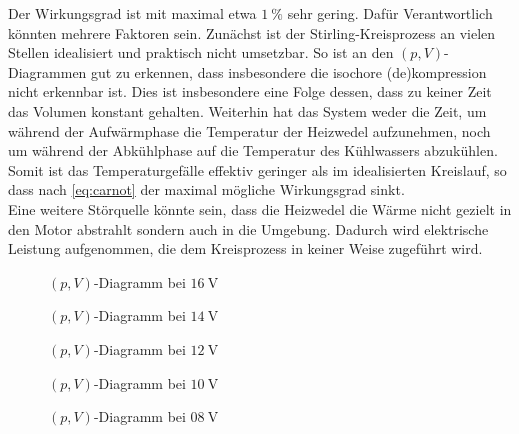 Der Wirkungsgrad ist mit maximal etwa $ \SI{1}{\percent} $ sehr gering. Dafür Verantwortlich könnten mehrere Faktoren sein. Zunächst ist der Stirling-Kreisprozess an vielen Stellen idealisiert und praktisch nicht umsetzbar. So ist an den $ (p,V) $-Diagrammen gut zu erkennen, dass insbesondere die isochore (de)kompression nicht erkennbar ist. Dies ist insbesondere eine Folge dessen, dass zu keiner Zeit das Volumen konstant gehalten. Weiterhin hat das System weder die Zeit, um während der Aufwärmphase die Temperatur der Heizwedel aufzunehmen, noch um während der Abkühlphase auf die Temperatur des Kühlwassers abzukühlen. Somit ist das Temperaturgefälle effektiv geringer als im idealisierten Kreislauf, so dass nach \ref{eq:carnot} der maximal mögliche Wirkungsgrad sinkt. \\
Eine weitere Störquelle könnte sein, dass die Heizwedel die Wärme nicht gezielt in den Motor abstrahlt sondern auch in die Umgebung. Dadurch wird elektrische Leistung aufgenommen, die dem Kreisprozess in keiner Weise zugeführt wird.
\begin{figure}[h!]
	\centering
	
	\caption{$ (p,V) $-Diagramm bei $ \SI{16}{\volt} $}
	\label{fig:pV16}
\end{figure}
\begin{figure}[h!]
	\centering
	
	\caption{$ (p,V) $-Diagramm bei $ \SI{14}{\volt} $}
	\label{fig:pV14}
\end{figure}
\begin{figure}[h!]
	\centering
	
	\caption{$ (p,V) $-Diagramm bei $ \SI{12}{\volt} $}
	\label{fig:pV12}
\end{figure}
\begin{figure}[h!]
	\centering
	
	\caption{$ (p,V) $-Diagramm bei $ \SI{10}{\volt} $}
	\label{fig:pV10}
\end{figure}
\begin{figure}[h!]
	\centering
	
	\caption{$ (p,V) $-Diagramm bei $ \SI{08}{\volt} $}
	\label{fig:pV08}
\end{figure}

